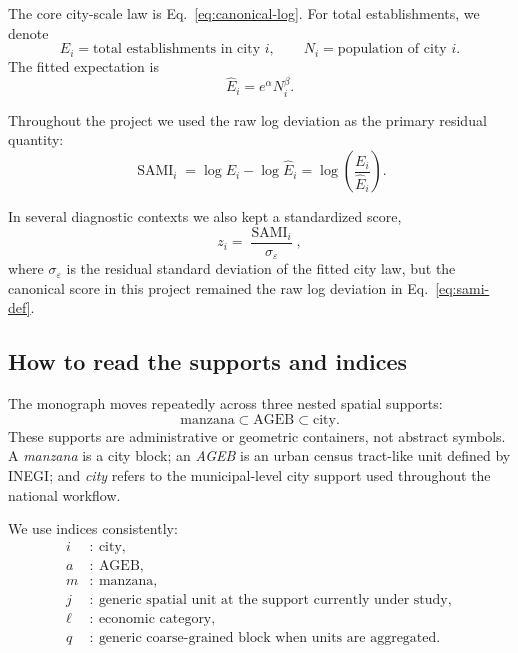 \documentclass[11pt]{article}
\newcommand{\SAMI}{\operatorname{SAMI}}
\begin{document}
The core city-scale law is Eq.~\eqref{eq:canonical-log}. For total establishments, we denote
\begin{equation}
E_i = \text{total establishments in city } i,
\qquad
N_i = \text{population of city } i.
\end{equation}
The fitted expectation is
\begin{equation}
\widehat{E}_i = e^\alpha N_i^\beta.
\end{equation}

Throughout the project we used the raw log deviation as the primary residual quantity:
\begin{equation}
\SAMI_i
=
\log E_i - \log \widehat{E}_i
=
\log\!\left(\frac{E_i}{\widehat{E}_i}\right).
\label{eq:sami-def}
\end{equation}

In several diagnostic contexts we also kept a standardized score,
\begin{equation}
z_i = \frac{\SAMI_i}{\sigma_\varepsilon},
\end{equation}
where \(\sigma_\varepsilon\) is the residual standard deviation of the fitted city law, but the canonical score in this project remained the raw log deviation in Eq.~\eqref{eq:sami-def}.

\subsection{How to read the supports and indices}

The monograph moves repeatedly across three nested spatial supports:
\begin{equation}
\text{manzana} \subset \text{AGEB} \subset \text{city}.
\end{equation}
These supports are administrative or geometric containers, not abstract symbols. A \emph{manzana} is a city block; an \emph{AGEB} is an urban census tract-like unit defined by INEGI; and \emph{city} refers to the municipal-level city support used throughout the national workflow.

We use indices consistently:
\begin{align}
i &:\ \text{city},\\
a &:\ \text{AGEB},\\
m &:\ \text{manzana},\\
j &:\ \text{generic spatial unit at the support currently under study},\\
\ell &:\ \text{economic category},\\
q &:\ \text{generic coarse-grained block when units are aggregated}.
\end{align}
\end{document}

